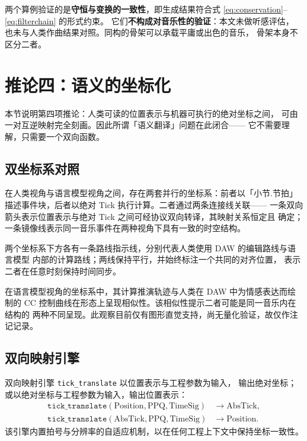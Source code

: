 \documentclass[11pt,a4paper,fontset=none]{ctexart}
\begin{document}
\begin{注记}[验证的限度]
两个算例验证的是\textbf{守恒与变换的一致性}，即生成结果符合式
\eqref{eq:conservation}--\eqref{eq:filterchain} 的形式约束。
它们\textbf{不构成对音乐性的验证}：本文未做听感评估，
也未与人类作曲结果对照。同构的骨架可以承载平庸或出色的音乐，
骨架本身不区分二者。
\end{注记}

\section{推论四：语义的坐标化}
\label{sec:semantic}

本节说明第四项推论：人类可读的位置表示与机器可执行的绝对坐标之间，
可由一对互逆映射完全刻画。因此所谓「语义翻译」问题在此闭合——
它不需要理解，只需要一个双向函数。
\subsection{双坐标系对照}

在人类视角与语言模型视角之间，存在两套并行的坐标系：前者以「小节.节拍」
描述事件块，后者以绝对 Tick 执行计算。二者通过两条连接线关联——
一条双向箭头表示位置表示与绝对 Tick 之间可经协议双向转译，其映射关系恒定且
确定；一条镜像线表示同一音乐事件在两种视角下具有一致的时空结构。

两个坐标系下方各有一条路线指示线，分别代表人类使用 DAW 的编辑路线与语言模型
内部的计算路线；两线保持平行，并始终标注一个共同的对齐位置，
表示二者在任意时刻保持时间同步。

\begin{注记}[一处待验证的观察]
在语言模型视角的坐标系中，其计算推演轨迹与人类在 DAW 中为情感表达而绘制的
CC 控制曲线在形态上呈现相似性。该相似性提示二者可能是同一音乐内在结构的
两种不同呈现。此观察目前仅有图形直觉支持，尚无量化验证，故仅作注记记录。
\end{注记}

\subsection{双向映射引擎}

\begin{定义}
双向映射引擎 \texttt{tick\_translate} 以位置表示与工程参数为输入，
输出绝对坐标；或以绝对坐标与工程参数为输入，输出位置表示：
\begin{align}
  \texttt{tick\_translate}(\mathrm{Position}, \mathrm{PPQ}, \mathrm{TimeSig})
    &\to \mathrm{AbsTick}, \label{eq:tt1}\\
  \texttt{tick\_translate}(\mathrm{AbsTick}, \mathrm{PPQ}, \mathrm{TimeSig})
    &\to \mathrm{Position}. \label{eq:tt2}
\end{align}
该引擎内置拍号与分辨率的自适应机制，以在任何工程上下文中保持坐标一致性。
\end{定义}
\end{document}
